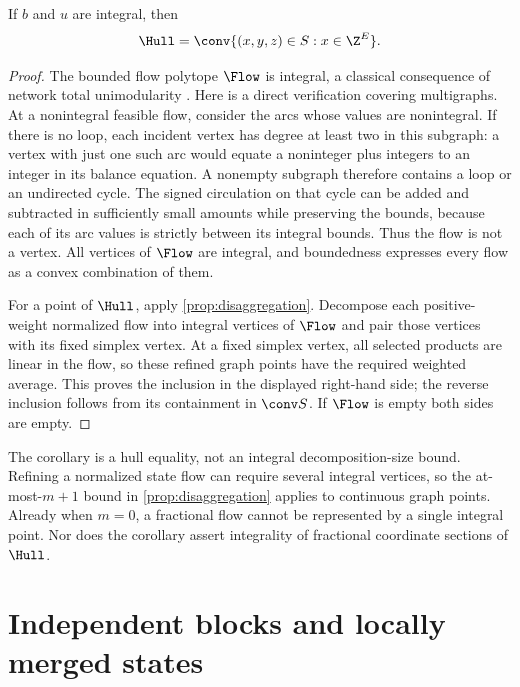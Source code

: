 \begin{corollary}\label{cor:integral-flows}
If $b$ and $u$ are integral, then
\[
 \Hull=\conv\{(x,y,z)\in S:x\in\Z^E\}.
\]
\end{corollary}
\begin{proof}
The bounded flow polytope $\Flow$ is integral, a classical consequence of
network total unimodularity \citep{HoffmanKruskal1956}. Here is a direct
verification covering multigraphs. At a nonintegral feasible flow, consider
the arcs whose values are nonintegral. If there is no loop, each incident
vertex has degree at least two in this subgraph: a vertex with just one
such arc would equate a noninteger plus integers to an integer in its
balance equation. A nonempty subgraph therefore contains a loop or an
undirected cycle. The signed
circulation on that cycle can be added and subtracted in sufficiently small
amounts while preserving the bounds, because each of its arc values is
strictly between its integral bounds. Thus the flow is not a vertex.
All vertices of $\Flow$ are integral, and boundedness expresses every
flow as a convex combination of them.

For a point of $\Hull$, apply \cref{prop:disaggregation}. Decompose each
positive-weight normalized flow into integral vertices of $\Flow$ and
pair those vertices with its fixed simplex vertex. At a fixed simplex
vertex, all selected products are linear in the flow, so these refined
graph points have the required weighted average. This proves the inclusion
in the displayed right-hand side; the reverse inclusion follows from its
containment in $\conv S$. If $\Flow$ is empty both sides are empty.
\end{proof}

The corollary is a hull equality, not an integral decomposition-size bound.
Refining a normalized state flow can require several integral vertices,
so the at-most-$m+1$ bound in \cref{prop:disaggregation} applies to
continuous graph points. Already when $m=0$, a fractional flow cannot be
represented by a single integral point. Nor does the corollary assert
integrality of fractional coordinate sections of $\Hull$.

\section{Independent blocks and locally merged states}\label{sec:blocks}

